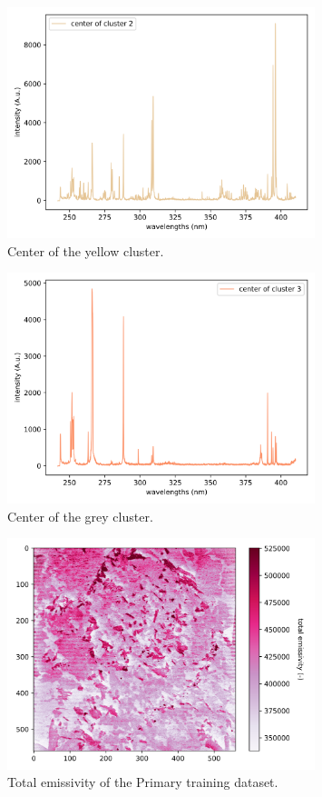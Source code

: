 \documentclass[preprint,11pt]{elsarticle}
\begin{document}
\begin{figure}[!htb]
    \centering
    \includegraphics[width=0.8\textwidth]{cluster_center_2.png}
    \caption{Center of the yellow cluster.}
\end{figure}

\begin{figure}[!htb]
    \centering
    \includegraphics[width=0.8\textwidth]{cluster_center_3.png}
    \caption{Center of the grey cluster.}
\end{figure}

\begin{figure}[!htb]
    \centering
    \includegraphics[width=0.8\textwidth]{original_s1_train_emissivity.png}
    \caption{Total emissivity of the Primary training dataset.}
\end{figure}
\end{document}
